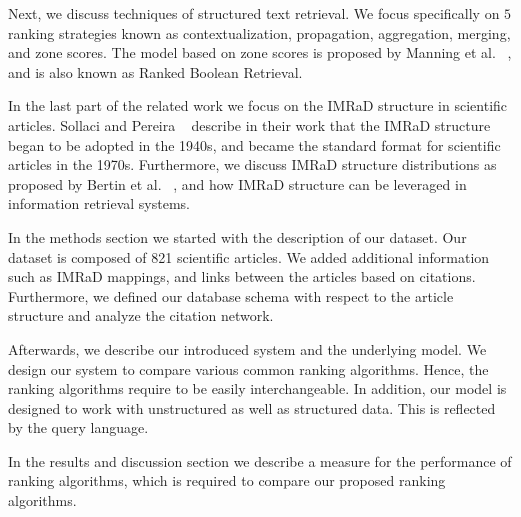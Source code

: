 Next, we discuss techniques of structured text retrieval. We focus specifically on $5$ ranking strategies known as contextualization, propagation, aggregation, merging, and zone scores. The model based on zone scores is proposed by Manning et al. ~\cite{manning2008}, and is also known as Ranked Boolean Retrieval.

In the last part of the related work we focus on the IMRaD structure in scientific articles. Sollaci and Pereira ~\cite{Sollaci-The-2004} describe in their work that the IMRaD structure began to be adopted in the 1940s, and became the standard format for scientific articles in the 1970s. Furthermore, we discuss IMRaD structure distributions as proposed by Bertin et al. ~\cite{bertin2013}, and how IMRaD structure can be leveraged in information retrieval systems.

In the methods section we started with the description of our dataset. Our dataset is composed of 821 scientific articles. We added additional information such as IMRaD mappings, and links between the articles based on citations. Furthermore, we defined our database schema with respect to the article structure and analyze the citation network.

Afterwards, we describe our introduced system and the underlying model. We design our system to compare various common ranking algorithms. Hence, the ranking algorithms require to be easily interchangeable. In addition, our model is designed to work with unstructured as well as structured data. This is reflected by the query language.

In the results and discussion section we describe a measure for the performance of ranking algorithms, which is required to compare our proposed ranking algorithms.

